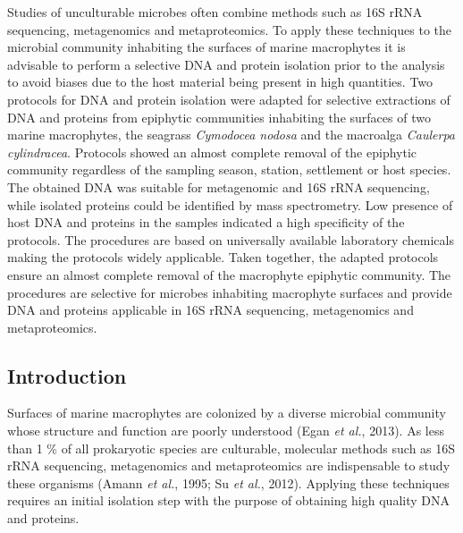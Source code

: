 \documentclass[12pt,]{article}
\begin{document}
Studies of unculturable microbes often combine methods such as 16S rRNA
sequencing, metagenomics and metaproteomics. To apply these techniques
to the microbial community inhabiting the surfaces of marine macrophytes
it is advisable to perform a selective DNA and protein isolation prior
to the analysis to avoid biases due to the host material being present
in high quantities. Two protocols for DNA and protein isolation were
adapted for selective extractions of DNA and proteins from epiphytic
communities inhabiting the surfaces of two marine macrophytes, the
seagrass \emph{Cymodocea nodosa} and the macroalga \emph{Caulerpa
cylindracea}. Protocols showed an almost complete removal of the
epiphytic community regardless of the sampling season, station,
settlement or host species. The obtained DNA was suitable for
metagenomic and 16S rRNA sequencing, while isolated proteins could be
identified by mass spectrometry. Low presence of host DNA and proteins
in the samples indicated a high specificity of the protocols. The
procedures are based on universally available laboratory chemicals
making the protocols widely applicable. Taken together, the adapted
protocols ensure an almost complete removal of the macrophyte epiphytic
community. The procedures are selective for microbes inhabiting
macrophyte surfaces and provide DNA and proteins applicable in 16S rRNA
sequencing, metagenomics and metaproteomics.

\newpage

\hypertarget{introduction}{%
\subsection{Introduction}\label{introduction}}

Surfaces of marine macrophytes are colonized by a diverse microbial
community whose structure and function are poorly understood (Egan
\emph{et al.}, 2013). As less than 1 \% of all prokaryotic species are
culturable, molecular methods such as 16S rRNA sequencing, metagenomics
and metaproteomics are indispensable to study these organisms (Amann
\emph{et al.}, 1995; Su \emph{et al.}, 2012). Applying these techniques
requires an initial isolation step with the purpose of obtaining high
quality DNA and proteins.
\end{document}
